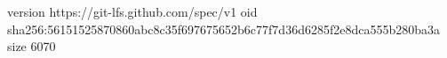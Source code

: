 version https://git-lfs.github.com/spec/v1
oid sha256:56151525870860abc8c35f697675652b6c77f7d36d6285f2e8dca555b280ba3a
size 6070
